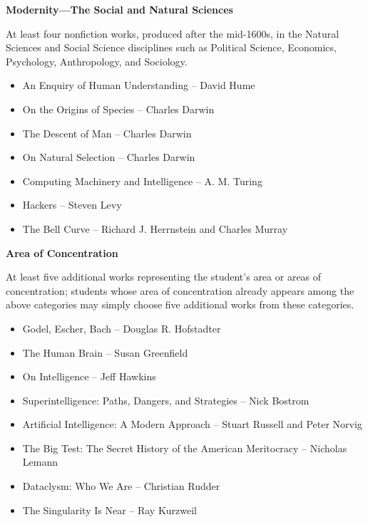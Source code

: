 \documentclass[11pt]{article}
\begin{document}
\par \textbf{Modernity—The Social and Natural Sciences}
\par At least four nonfiction works, produced after the mid-1600s, in the Natural Sciences and Social Science disciplines such as Political Science, Economics, Psychology, Anthropology, and Sociology.
\begin{itemize}
	\item An Enquiry of Human Understanding -- David Hume
	\item On the Origins of Species -- Charles Darwin
	\item The Descent of Man -- Charles Darwin
	\item On Natural Selection -- Charles Darwin
	\item Computing Machinery and Intelligence -- A. M. Turing
	\item Hackers -- Steven Levy
	\item The Bell Curve -- Richard J. Herrnstein and Charles Murray
\end{itemize}

\par \textbf{Area of Concentration}
\par At least five additional works representing the student's area or areas of concentration; students whose area of concentration already appears among the above categories may simply choose five additional works from these categories.
\begin{itemize}
	\item Godel, Escher, Bach -- Douglas R. Hofstadter
	\item The Human Brain -- Susan Greenfield
	\item On Intelligence -- Jeff Hawkins
	\item Superintelligence: Paths, Dangers, and Strategies -- Nick Bostrom
	\item Artificial Intelligence: A Modern Approach -- Stuart Russell and Peter Norvig
	\item The Big Test: The Secret History of the American Meritocracy -- Nicholas Lemann
	\item Dataclysm: Who We Are -- Christian Rudder
	\item The Singularity Is Near -- Ray Kurzweil
\end{itemize}
\end{document}
